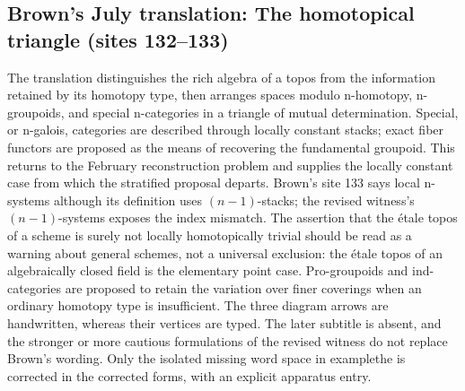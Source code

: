 \documentclass[10pt,oneside]{book}
\begin{document}
\subsection*{Brown's July translation: The homotopical triangle (sites 132--133)}
The translation distinguishes the rich algebra of a topos from the information retained by its homotopy type, then arranges spaces modulo n-homotopy, n-groupoids, and special n-categories in a triangle of mutual determination. Special, or n-galois, categories are described through locally constant stacks; exact fiber functors are proposed as the means of recovering the fundamental groupoid. This returns to the February reconstruction problem and supplies the locally constant case from which the stratified proposal departs. Brown's site 133 says local n-systems although its definition uses $(n-1)$-stacks; the revised witness's $(n-1)$-systems exposes the index mismatch. The assertion that the étale topos of a scheme is surely not locally homotopically trivial should be read as a warning about general schemes, not a universal exclusion: the étale topos of an algebraically closed field is the elementary point case. Pro-groupoids and ind-categories are proposed to retain the variation over finer coverings when an ordinary homotopy type is insufficient. The three diagram arrows are handwritten, whereas their vertices are typed. The later subtitle is absent, and the stronger or more cautious formulations of the revised witness do not replace Brown's wording. Only the isolated missing word space in examplethe is corrected in the corrected forms, with an explicit apparatus entry.
\end{document}
